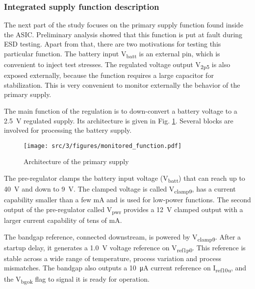 \subsubsection{Integrated supply function description}
\label{sec:supply-desc}

The next part of the study focuses on the primary supply function found inside the ASIC.
Preliminary analysis showed that this function is put at fault during ESD testing.
Apart from that, there are two motivations for testing this particular function.
The battery input V\textsubscript{batt} is an external pin, which is convenient to inject test stresses.
The regulated voltage output V\textsubscript{2p5} is also exposed externally, because the function requires a large capacitor for stabilization.
This is very convenient to monitor externally the behavior of the primary supply.

The main function of the regulation is to down-convert a battery voltage to a \SI{2.5}{\volt} regulated supply.
Its architecture is given in Fig. \ref{fig:monitored_function}.
Several blocks are involved for processing the battery supply.

\begin{figure}[!h]
  \centering
  \texttt{[image: src/3/figures/monitored\_function.pdf]}
  \caption{Architecture of the primary supply}
  \label{fig:monitored_function}
\end{figure}

The pre-regulator clamps the battery input voltage (V\textsubscript{batt}) that can reach up to \SI{40}{\volt} and down to \SI{9}{\volt}.
The clamped voltage is called V\textsubscript{clamp9}, has a current capability smaller than a few mA and is used for low-power functions.
The second output of the pre-regulator called V\textsubscript{pwr} provides a \SI{12}{\volt} clamped output with a larger current capability of tens of mA.

The bandgap reference, connected downstream, is powered by V\textsubscript{clamp9}.
After a startup delay, it generates a \SI{1.0}{\volt} voltage reference on V\textsubscript{ref1p0}.
This reference is stable across a wide range of temperature, process variation and process mismatches.
The bandgap also outputs a \SI{10}{\micro\ampere} current reference on I\textsubscript{ref10u}, and the V\textsubscript{bgok} flag to signal it is ready for operation.

